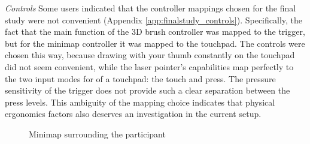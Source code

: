 \textit{Controls} Some users indicated that the controller mappings chosen for the final study were not convenient (Appendix \ref{app:finalstudy_controls}). Specifically, the fact that the main function of the 3D brush controller was mapped to the trigger, but for the minimap controller it was mapped to the touchpad. The controls were chosen this way, because drawing with your thumb constantly on the touchpad did not seem convenient, while the laser pointer's capabilities map perfectly to the two input modes for of a touchpad: the touch and press. The pressure sensitivity of the trigger does not provide such a clear separation between the press levels. This ambiguity of the mapping choice indicates that physical ergonomics factors also deserves an investigation in the current setup.

\begin{figure}[h]
	\centering
	\caption{Minimap surrounding the participant}
	\label{fig:finalstudyminimaparound}
\end{figure}